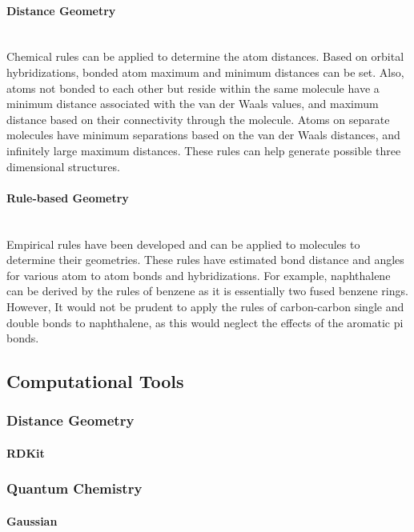 \documentclass[12pt]{article}
\begin{document}
\paragraph{Distance Geometry}\mbox{}\\

Chemical rules can be applied to determine the atom distances. Based on orbital hybridizations, bonded atom maximum and minimum distances can be set. Also, atoms not bonded to each other but reside within the same molecule have a minimum distance associated with the van der Waals values, and maximum distance based on their connectivity through the molecule. Atoms on separate molecules have minimum separations based on the van der Waals distances, and infinitely large maximum distances. These rules can help generate possible three dimensional structures.

\paragraph{Rule-based Geometry}\mbox{}\\

Empirical rules have been developed and can be applied to molecules to determine their geometries. These rules have estimated bond distance and angles for various atom to atom bonds and hybridizations. For example, naphthalene can be derived by the rules of benzene as it is essentially two fused benzene rings. However, It would not be prudent to apply the rules of carbon-carbon single and double bonds to naphthalene, as this would neglect the effects of the aromatic pi bonds.

\subsection{Computational Tools}
\subsubsection{Distance Geometry}
\paragraph{RDKit}
\subsubsection{Quantum Chemistry}
\paragraph{Gaussian}
\end{document}
